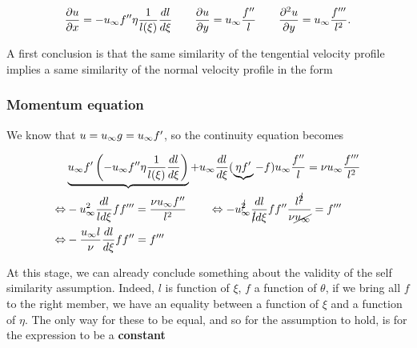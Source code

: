 			\begin{equation}
				\frac{\D u }{\D x} = - \uinf f''\eta \frac{1}{l(\xi)} \frac{dl}{d\xi} \qquad \frac{\D u}{\D y} = \uinf \frac{f''}{l} \qquad \frac{\D ^2 u}{\D y }= \uinf \frac{f'''}{l^2}.
			\end{equation}
			
			A first conclusion is that the same similarity of the tengential velocity profile implies a same similarity of the normal velocity profile in the form
			
			\begin{center}
			\end{center}
			
		\subsubsection{Momentum equation}
			We know that $u = \uinf g = \uinf f'$, so the continuity equation becomes
			
			\begin{equation}
			\begin{aligned}
				&\underbrace{\uinf f' \left(  - \uinf f''\eta \frac{1}{l(\xi)} \frac{dl}{d\xi} \right)} + \uinf \frac{dl}{d\xi}(\underbrace{\eta f'} - f) \uinf \frac{f''}{l} = \nu \uinf \frac{f'''}{l^2} \\
				\Leftrightarrow  &- \uinf ^2 \frac{dl}{ld \xi} ff''' = \frac{  \nu \uinf f''}{l^2} \qquad \Leftrightarrow - \uinf ^{\cancel{2}} \frac{dl}{\cancel{l}d \xi} ff'' \frac{l^{\cancel{2}}}{\nu \cancel{\uinf}} = f'''\\
				\Leftrightarrow &-\frac{\uinf l}{\nu} \frac{dl}{d\xi} ff'' = f'''
			\end{aligned}
			\end{equation}
			
			At this stage, we can already conclude something about the validity of the self similarity assumption. Indeed, $l$ is function of $\xi$, $f$ a function of $\theta$, if we bring all $f$ to the right member, we have an equality between a function of $\xi$ and a function of $\eta$. The only way for these to be equal, and so for the assumption to hold, is for the expression to be a \textbf{constant}
			
			\begin{center}
			\end{center}
			
